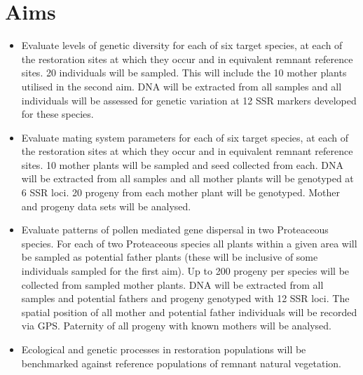 \documentclass[version=last,
    paper=a4, %
    10pt, %
    usenames,
    dvipsnames,
    oneside, %
    headings=openany, %
    DIV=15 %
]{scrbook}
\begin{document}
\section*{Aims}
\begin{itemize}
\itemsep1pt\parskip0pt
\item
  Evaluate levels of genetic diversity for each of six target species,
  at each of the restoration sites at which they occur and in equivalent
  remnant reference sites. 20 individuals will be sampled. This will
  include the 10 mother plants utilised in the second aim. DNA will be
  extracted from all samples and all individuals will be assessed for
  genetic variation at 12 SSR markers developed for these species.
\item
  Evaluate mating system parameters for each of six target species, at
  each of the restoration sites at which they occur and in equivalent
  remnant reference sites. 10 mother plants will be sampled and seed
  collected from each. DNA will be extracted from all samples and all
  mother plants will be genotyped at 6 SSR loci. 20 progeny from each
  mother plant will be genotyped. Mother and progeny data sets will be
  analysed.
\item
  Evaluate patterns of pollen mediated gene dispersal in two Proteaceous
  species. For each of two Proteaceous species all plants within a given
  area will be sampled as potential father plants (these will be
  inclusive of some individuals sampled for the first aim). Up to 200
  progeny per species will be collected from sampled mother plants. DNA
  will be extracted from all samples and potential fathers and progeny
  genotyped with 12 SSR loci. The spatial position of all mother and
  potential father individuals will be recorded via GPS. Paternity of
  all progeny with known mothers will be analysed.
\item
  Ecological and genetic processes in restoration populations will be
  benchmarked against reference populations of remnant natural
  vegetation.
\end{itemize}
\end{document}
